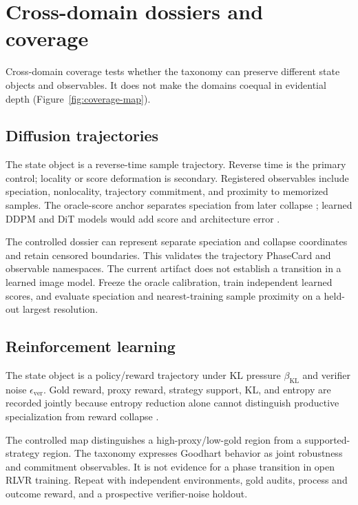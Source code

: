 \section{Cross-domain dossiers and coverage}
\label{sec:crossdomain}

Cross-domain coverage tests whether the taxonomy can preserve different state
objects and observables. It does not make the domains coequal in evidential
depth (Figure~\ref{fig:coverage-map}).

\subsection{Diffusion trajectories}

The state object is a reverse-time sample trajectory. Reverse time is the
primary control; locality or score deformation is secondary. Registered
observables include speciation, nonlocality, trajectory commitment, and
proximity to memorized samples. The oracle-score anchor separates speciation
from later collapse \cite{biroli2024dynamical}; learned DDPM and DiT models
would add score and architecture error \cite{ho2020ddpm,peebles2023dit}.

 The controlled dossier can represent separate speciation
and collapse coordinates and retain censored boundaries. 
This validates the trajectory PhaseCard and observable namespaces.
 The current artifact does not establish a transition
in a learned image model.  Freeze the oracle calibration,
train independent learned scores, and evaluate speciation and nearest-training
sample proximity on a held-out largest resolution.

\subsection{Reinforcement learning}

The state object is a policy/reward trajectory under KL pressure
$\beta_{\mathrm{KL}}$ and verifier noise $\epsilon_{\mathrm{ver}}$. Gold reward,
proxy reward, strategy support, KL, and entropy are recorded jointly because
entropy reduction alone cannot distinguish productive specialization from
reward collapse \cite{gao2023reward,rafailov2024overoptimization}.

 The controlled map distinguishes a high-proxy/low-gold
region from a supported-strategy region.  The taxonomy
expresses Goodhart behavior as joint robustness and commitment observables.
 It is not evidence for a phase transition in open
RLVR training.  Repeat with independent environments,
gold audits, process and outcome reward, and a prospective verifier-noise
holdout.

